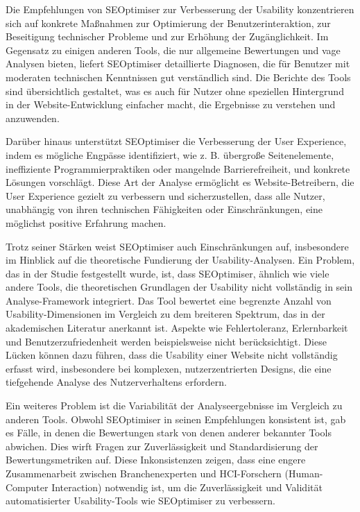 Die Empfehlungen von SEOptimiser zur Verbesserung der Usability konzentrieren sich auf konkrete Maßnahmen zur Optimierung der Benutzerinteraktion, zur Beseitigung technischer Probleme und zur Erhöhung der Zugänglichkeit. Im Gegensatz zu einigen anderen Tools, die nur allgemeine Bewertungen und vage Analysen bieten, liefert SEOptimiser detaillierte Diagnosen, die für Benutzer mit moderaten technischen Kenntnissen gut verständlich sind. Die Berichte des Tools sind übersichtlich gestaltet, was es auch für Nutzer ohne speziellen Hintergrund in der Website-Entwicklung einfacher macht, die Ergebnisse zu verstehen und anzuwenden.

Darüber hinaus unterstützt SEOptimiser die Verbesserung der User Experience, indem es mögliche Engpässe identifiziert, wie z. B. übergroße Seitenelemente, ineffiziente Programmierpraktiken oder mangelnde Barrierefreiheit, und konkrete Lösungen vorschlägt. Diese Art der Analyse ermöglicht es Website-Betreibern, die User Experience gezielt zu verbessern und sicherzustellen, dass alle Nutzer, unabhängig von ihren technischen Fähigkeiten oder Einschränkungen, eine möglichst positive Erfahrung machen.

Trotz seiner Stärken weist SEOptimiser auch Einschränkungen auf, insbesondere im Hinblick auf die theoretische Fundierung der Usability-Analysen. Ein Problem, das in der Studie festgestellt wurde, ist, dass SEOptimiser, ähnlich wie viele andere Tools, die theoretischen Grundlagen der Usability nicht vollständig in sein Analyse-Framework integriert. Das Tool bewertet eine begrenzte Anzahl von Usability-Dimensionen im Vergleich zu dem breiteren Spektrum, das in der akademischen Literatur anerkannt ist. Aspekte wie Fehlertoleranz, Erlernbarkeit und Benutzerzufriedenheit werden beispielsweise nicht berücksichtigt. Diese Lücken können dazu führen, dass die Usability einer Website nicht vollständig erfasst wird, insbesondere bei komplexen, nutzerzentrierten Designs, die eine tiefgehende Analyse des Nutzerverhaltens erfordern.

Ein weiteres Problem ist die Variabilität der Analyseergebnisse im Vergleich zu anderen Tools. Obwohl SEOptimiser in seinen Empfehlungen konsistent ist, gab es Fälle, in denen die Bewertungen stark von denen anderer bekannter Tools abwichen. Dies wirft Fragen zur Zuverlässigkeit und Standardisierung der Bewertungsmetriken auf. Diese Inkonsistenzen zeigen, dass eine engere Zusammenarbeit zwischen Branchenexperten und HCI-Forschern (Human-Computer Interaction) notwendig ist, um die Zuverlässigkeit und Validität automatisierter Usability-Tools wie SEOptimiser zu verbessern.

